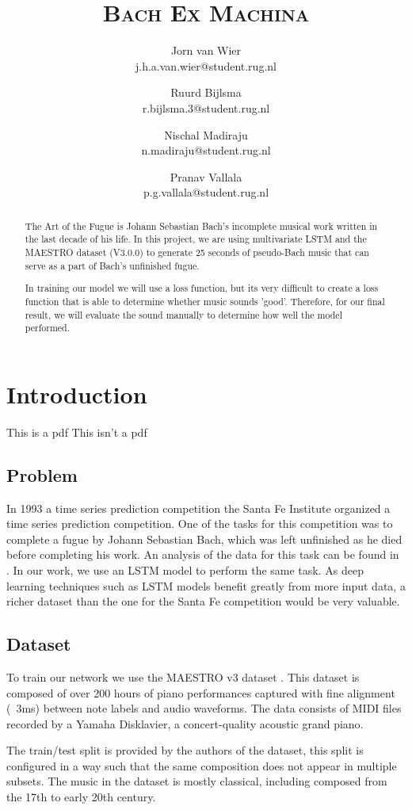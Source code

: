 \documentclass[11pt, twocolumn]{article}
\title{\vspace{1.5cm}\textbf{\scshape{Bach Ex Machina}}}
\author{
    Jorn van Wier\\
    \small j.h.a.van.wier@student.rug.nl

    \and

    Ruurd Bijlsma\\
    \small r.bijlsma.3@student.rug.nl

    \and

    Nischal Madiraju\\
    \small n.madiraju@student.rug.nl

    \and

    Pranav Vallala\\
    \small p.g.vallala@student.rug.nl
}
\date{}
\begin{document}

    \maketitle

    \thispagestyle{firstpage}

    \begin{abstract}
        \noindent
        The Art of the Fugue is Johann Sebastian Bach's incomplete musical work written in the last decade of his life. In this project, we are using multivariate LSTM and the MAESTRO dataset (V3.0.0) to generate 25 seconds of pseudo-Bach music that can serve as a part of Bach's unfinished fugue.

        In training our model we will use a loss function, but its very difficult to create a loss function that is able to determine whether music sounds 'good'. Therefore, for our final result, we will evaluate the sound manually to determine how well the model performed.

    \end{abstract}
    \section{Introduction}
    \ifpdf
    This is a pdf
    \else
    This isn't a pdf
    \fi

    \subsection{Problem}
    In 1993 a time series prediction competition the Santa Fe Institute organized a time series prediction competition. One of the tasks for this competition was to complete a fugue by Johann Sebastian Bach, which was left unfinished as he died before completing his work.
    An analysis of the data for this task can be found in \cite{dirstt1993baroque}. In our work, we use an LSTM model to perform the same task. As deep learning techniques such as LSTM models benefit greatly from more input data, a richer dataset than the one for the Santa Fe competition would be very valuable.

    \subsection{Dataset}
    To train our network we use the MAESTRO v3 dataset \cite{hawthorne2018enabling}. This dataset is composed of over 200 hours of piano performances captured with fine alignment (~3ms) between note labels and audio waveforms. The data consists of MIDI files recorded by a Yamaha Disklavier, a concert-quality acoustic grand piano.
    \par
    The train/test split is provided by the authors of the dataset, this split is configured in a way such that the same composition does not appear in multiple subsets. The music in the dataset is mostly classical, including composed from the 17th to early 20th century.
\end{document}
